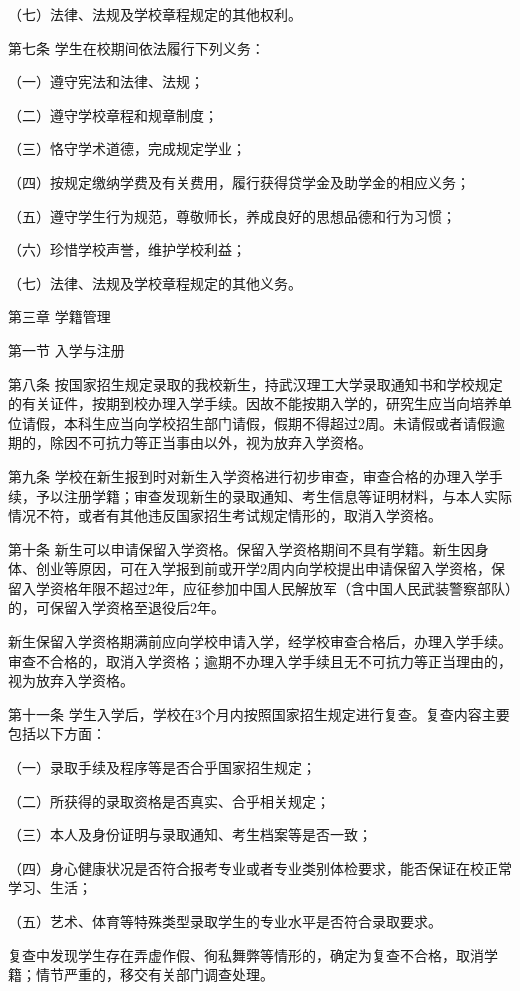 \documentclass[UTF8,12pt,a4paper]{report}
\begin{document}
（七）法律、法规及学校章程规定的其他权利。

第七条 学生在校期间依法履行下列义务：

（一）遵守宪法和法律、法规；

（二）遵守学校章程和规章制度；

（三）恪守学术道德，完成规定学业；

（四）按规定缴纳学费及有关费用，履行获得贷学金及助学金的相应义务；

（五）遵守学生行为规范，尊敬师长，养成良好的思想品德和行为习惯；

（六）珍惜学校声誉，维护学校利益；

（七）法律、法规及学校章程规定的其他义务。



第三章 学籍管理

第一节   入学与注册

第八条 按国家招生规定录取的我校新生，持武汉理工大学录取通知书和学校规定的有关证件，按期到校办理入学手续。因故不能按期入学的，研究生应当向培养单位请假，本科生应当向学校招生部门请假，假期不得超过2周。未请假或者请假逾期的，除因不可抗力等正当事由以外，视为放弃入学资格。

第九条 学校在新生报到时对新生入学资格进行初步审查，审查合格的办理入学手续，予以注册学籍；审查发现新生的录取通知、考生信息等证明材料，与本人实际情况不符，或者有其他违反国家招生考试规定情形的，取消入学资格。

第十条 新生可以申请保留入学资格。保留入学资格期间不具有学籍。新生因身体、创业等原因，可在入学报到前或开学2周内向学校提出申请保留入学资格，保留入学资格年限不超过2年，应征参加中国人民解放军（含中国人民武装警察部队）的，可保留入学资格至退役后2年。

新生保留入学资格期满前应向学校申请入学，经学校审查合格后，办理入学手续。审查不合格的，取消入学资格；逾期不办理入学手续且无不可抗力等正当理由的，视为放弃入学资格。

第十一条 学生入学后，学校在3个月内按照国家招生规定进行复查。复查内容主要包括以下方面：

（一）录取手续及程序等是否合乎国家招生规定；

（二）所获得的录取资格是否真实、合乎相关规定；

（三）本人及身份证明与录取通知、考生档案等是否一致；

（四）身心健康状况是否符合报考专业或者专业类别体检要求，能否保证在校正常学习、生活；

（五）艺术、体育等特殊类型录取学生的专业水平是否符合录取要求。

复查中发现学生存在弄虚作假、徇私舞弊等情形的，确定为复查不合格，取消学籍；情节严重的，移交有关部门调查处理。
\end{document}
